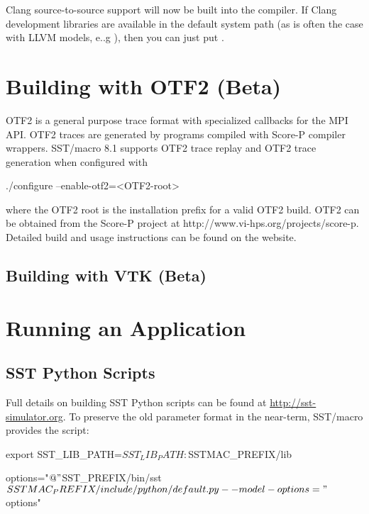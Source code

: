 Clang source-to-source support will now be built into the  compiler. 
If Clang development libraries are available in the default system path (as is often the case with LLVM models, e..g ),
then you can just put .

\section{Building with OTF2 (Beta)}
\label{sec:buildingOtf2}
OTF2 is a general purpose trace format with specialized callbacks for the MPI API. OTF2 traces are generated by programs compiled with Score-P compiler wrappers. SST/macro 8.1 supports OTF2 trace replay and OTF2 trace generation when configured with 

\begin{ViFile}
./configure --enable-otf2=<OTF2-root>	
\end{ViFile}
where the OTF2 root is the installation prefix for a valid OTF2 build. OTF2 can be obtained from the Score-P project at {http://www.vi-hps.org/projects/score-p}.
Detailed build and usage instructions can be found on the website.

\subsection{Building with VTK (Beta)}
\label{sec:buildingVTK}



\section{Running an Application}\label{sec:building:running}
\subsection{SST Python Scripts}
\label{subsec:SSTPythonScripts}

Full details on building SST Python scripts can be found at \url{http://sst-simulator.org}.  To preserve the old parameter format in the near-term, SST/macro provides the  script:

\begin{ViFile}
export SST_LIB_PATH=$SST_LIB_PATH:$SSTMAC_PREFIX/lib

options="$@"
$SST_PREFIX/bin/sst $SSTMAC_PREFIX/include/python/default.py --model-options="$options"
\end{ViFile}

